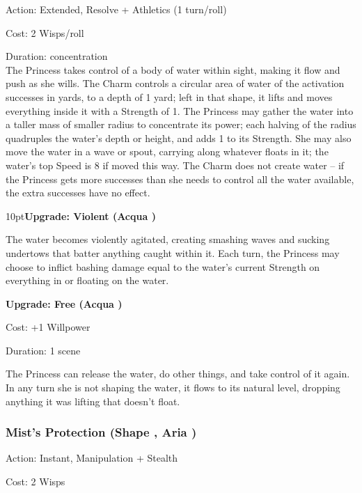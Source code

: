 \noindent Action: Extended, Resolve + Athletics (1 turn/roll)

\noindent Cost: 2 Wisps/roll

\noindent Duration: concentration \\

\noindent The Princess takes control of a body of water within sight, making it flow and push as she wills. The Charm controls a circular area of water of the activation successes in yards, to a depth of 1 yard; left in that shape, it lifts and moves everything inside it with a Strength of 1. The Princess may gather the water into a taller mass of smaller radius to concentrate its power; each halving of the radius quadruples the water's depth or height, and adds 1 to its Strength. She may also move the water in a wave or spout, carrying along whatever floats in it; the water's top Speed is 8 if moved this way. The Charm does not create water -- if the Princess gets more successes than she needs to control all the water available, the extra successes have no effect.

\begin{myindentpar}{10pt}\textbf{Upgrade: Violent (Acqua \textbullet\textbullet\textbullet)}

The water becomes violently agitated, creating smashing waves and sucking undertows that batter anything caught within it. Each turn, the Princess may choose to inflict bashing damage equal to the water's current Strength on everything in or floating on the water.

\textbf{Upgrade: Free (Acqua \textbullet\textbullet\textbullet\textbullet)}

\noindent Cost: +1 Willpower

\noindent Duration: 1 scene

The Princess can release the water, do other things, and take control of it again. In any turn she is not shaping the water, it flows to its natural level, dropping anything it was lifting that doesn't float.\end{myindentpar}

\subsubsection*{Mist's Protection (Shape \textbullet\textbullet\textbullet, Aria \textbullet\textbullet)}

\noindent Action: Instant, Manipulation + Stealth

\noindent Cost: 2 Wisps

